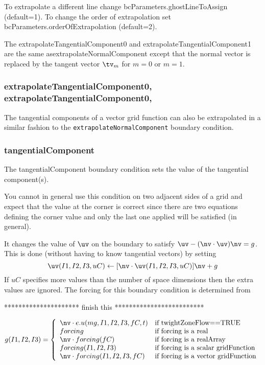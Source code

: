 To extrapolate a different line change {\ff bcParameters.ghostLineToAssign}
(default=1). To change the order of extrapolation set
{\ff bcParameters.orderOfExtrapolation} (default=2).

The {\ff extrapolateTangentialComponent0} and {\ff extrapolateTangentialComponent1} are the same as{\ff extrapolateNormalComponent}
except that the normal vector is replaced by the tangent vector $\tv_m$ for $m=0$ or $m=1$.

\subsubsection{extrapolateTangentialComponent0, extrapolateTangentialComponent0, }

The tangential components of a vector grid function can also be extrapolated in a similar fashion
to the {\tt extrapolateNormalComponent} boundary condition. 



\subsubsection{tangentialComponent}

The {\ff tangentialComponent} boundary condition sets the 
value of the tangential component(s).

 You cannot in general use this condition on two adjacent sides of a grid and
expect that the value at the corner is correct since there are two equations defining the corner
value and only the last one applied will be satisfied (in general).

It changes the value
of $\uv$ on the boundary to satisfy $\uv-(\nv\cdot\uv)\nv = g $. 
This is done (without having to know tangential vectors) by setting
\[
        \uv(I1,I2,I3,uC) \leftarrow [\nv\cdot\uv(I1,I2,I3,uC)]\nv + g
\]
If $uC$ specifies more values than the number of space dimensions then the extra values are
ignored. The forcing for this boundary condition is determined from

********************* finish this *************************

\[
 g(I1,I2,I3) =  \left\{ \begin{array}{ll}
        \nv\cdot \true u(mg,I1,I2,I3,fC,t) & \mbox{if twightZoneFlow==TRUE} \\
        forcing              & \mbox{if forcing is a real      } \\
        \nv\cdot forcing(fC)           & \mbox{if forcing  is a realArray      } \\
        forcing(I1,I2,I3)  & \mbox{if forcing is a scalar gridFunction} \\
        \nv\cdot forcing(I1,I2,I3,fC)  & \mbox{if forcing is a vector gridFunction} \\
          \end{array}
  \right.
\]



